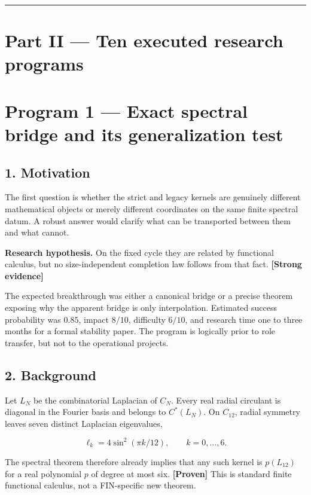 \documentclass[11pt,a4paper,openany]{report}
\newcommand{\statusProven}{\textcolor{fingreen}{[Proven]}}
\newcommand{\statusStrong}{\textcolor{finblue}{[Strong evidence]}}
\begin{document}
\par\medskip\hrule\medskip

\chapter{Part II — Ten executed research programs}

\chapter{Program 1 — Exact spectral bridge and its generalization test}

\section{1. Motivation}

The first question is whether the strict and legacy kernels are genuinely different mathematical objects or merely different coordinates on the same finite spectral datum. A robust answer would clarify what can be transported between them and what cannot.

\textbf{Research hypothesis.} On the fixed cycle they are related by functional calculus, but no size-independent completion law follows from that fact. \textbf{\statusStrong{}}

The expected breakthrough was either a canonical bridge or a precise theorem exposing why the apparent bridge is only interpolation. Estimated success probability was \(0.85\), impact \(8/10\), difficulty \(6/10\), and research time one to three months for a formal stability paper. The program is logically prior to role transfer, but not to the operational projects.

\section{2. Background}

Let \(L_N\) be the combinatorial Laplacian of \(C_N\). Every real radial circulant is diagonal in the Fourier basis and belongs to \(C^*(L_N)\). On \(C_{12}\), radial symmetry leaves seven distinct Laplacian eigenvalues,

\[
\ell_k=4\sin^2(\pi k/12),\qquad k=0,\ldots,6.
\]

The spectral theorem therefore already implies that any such kernel is \(p(L_{12})\) for a real polynomial \(p\) of degree at most six. \textbf{\statusProven{}} This is standard finite functional calculus, not a FIN-specific new theorem.
\end{document}
